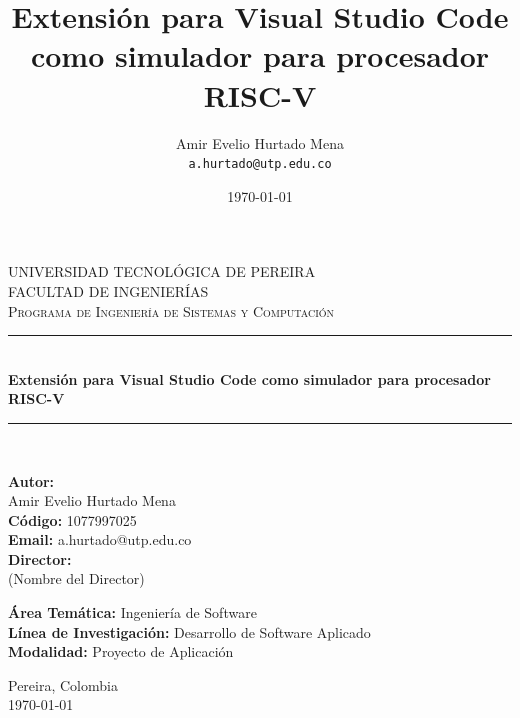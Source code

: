 \documentclass[12pt, letterpaper]{article} %
\title{Extensión para Visual Studio Code como simulador para procesador RISC-V}
\author{Amir Evelio Hurtado Mena \\ \texttt{a.hurtado@utp.edu.co}}
\date{\today} %
\begin{document}
\begin{titlepage}
    \centering %

    \textsc{\LARGE UNIVERSIDAD TECNOLÓGICA DE PEREIRA} \\[0.5cm]
    \textsc{\Large FACULTAD DE INGENIERÍAS} \\[0.5cm]
    \textsc{\large Programa de Ingeniería de Sistemas y Computación} \\[2cm]

    \rule{\textwidth}{0.4pt}\\[0.4cm]
    { \huge \bfseries Extensión para Visual Studio Code como simulador para procesador RISC-V \\[0.4cm] }
    \rule{\textwidth}{0.4pt}\\[2cm]

    \begin{flushleft} %
    \textbf{Autor:} \\
    Amir Evelio Hurtado Mena \\
    \textbf{Código:} 1077997025 \\
    \textbf{Email:} a.hurtado@utp.edu.co \\[1cm]

    \textbf{Director:} \\
    (Nombre del Director) \\[2cm]
    \end{flushleft}

    \begin{center} %
    \textbf{Área Temática:} Ingeniería de Software \\
    \textbf{Línea de Investigación:} Desarrollo de Software Aplicado  \\[0.5cm]
    \textbf{Modalidad:} Proyecto de Aplicación  \\[2cm]
    \end{center}

    \vfill %

    Pereira, Colombia \\
    \today

\end{titlepage}

\newpage %
\end{document}
